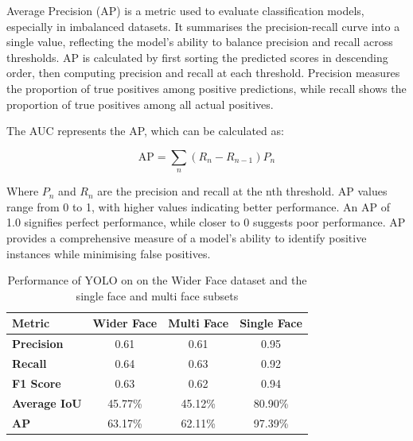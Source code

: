Average Precision (AP) is a metric used to evaluate classification models, especially in imbalanced datasets. It summarises the precision-recall curve into a single value, reflecting the model's ability to balance precision and recall across thresholds. AP is calculated by first sorting the predicted scores in descending order, then computing precision and recall at each threshold. Precision measures the proportion of true positives among positive predictions, while recall shows the proportion of true positives among all actual positives.

The AUC represents the AP, which can be calculated as:

\[
\text{AP} = \sum_n (R_n - R_{n-1}) P_n
\]

Where \(P_{n}\) and \(R_{n}\) are the precision and recall at the nth threshold. AP values range from 0 to 1, with higher values indicating better performance. An AP of 1.0 signifies perfect performance, while closer to 0 suggests poor performance. AP provides a comprehensive measure of a model's ability to identify positive instances while minimising false positives.

\begin{table}[h!]
\centering{}
\caption{Performance of YOLO on on the Wider Face dataset and the single face and multi face subsets}
\begin{tabular}{|l|c|c|c|}
\hline
\textbf{Metric}      & \textbf{Wider Face} & \textbf{Multi Face}  & \textbf{Single Face} \\ \hline
\textbf{Precision}   & 0.61        & 0.61            & 0.95                 \\ \hline
\textbf{Recall}      & 0.64        & 0.63            & 0.92                 \\ \hline
\textbf{F1 Score}    & 0.63        & 0.62            & 0.94                 \\ \hline
\textbf{Average IoU} & 45.77\%     & 45.12\%         & 80.90\%              \\ \hline
\textbf{AP}          & 63.17\%     & 62.11\%         & 97.39\%              \\ \hline
\end{tabular}
\label{tab:YOLO}
\end{table}

